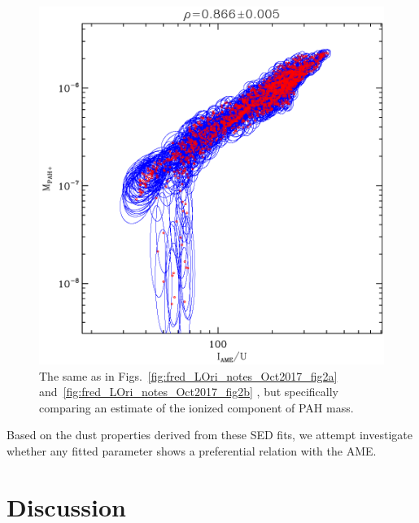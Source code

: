               \begin{figure}
                \includegraphics[width=\textwidth/2]{../Plots/ch_lori/fred_LOri_notes_Oct2017_fig2d.pdf}
                \centering
                \caption{ The same as in Figs.~\ref{fig:fred_LOri_notes_Oct2017_fig2a} and~\ref{fig:fred_LOri_notes_Oct2017_fig2b} , but specifically comparing an estimate of the ionized component of PAH mass. }
                \label{fig:fred_LOri_notes_Oct2017_fig2d}
              \end{figure}
    Based on the dust properties derived from these SED fits, we attempt investigate whether any fitted parameter shows a preferential relation with the AME.

  \section{Discussion}
